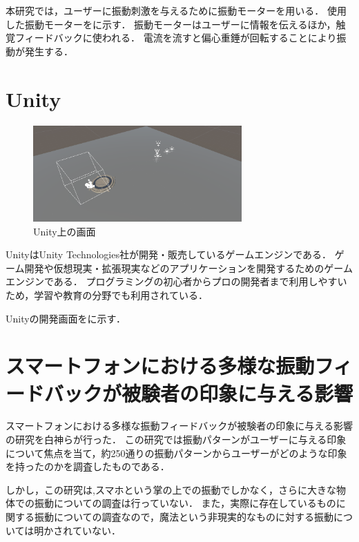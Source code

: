 本研究では，ユーザーに振動刺激を与えるために振動モーターを用いる．
使用した振動モーターをに示す．
振動モーターはユーザーに情報を伝えるほか，触覚フィードバックに使われる．
電流を流すと偏心重錘が回転することにより振動が発生する．

\section{Unity}

\begin{figure}[h]
\centering
\includegraphics[clip,width=8cm]{./fig/unity_first.png}
\caption{Unity上の画面}\label{unity}
\end{figure}

Unity\cite{unity}はUnity Technologies社が開発・販売しているゲームエンジンである．
ゲーム開発や仮想現実・拡張現実などのアプリケーションを開発するためのゲームエンジンである．
プログラミングの初心者からプロの開発者まで利用しやすいため，学習や教育の分野でも利用されている．

Unityの開発画面をに示す．

\newpage
\section{スマートフォンにおける多様な振動フィードバックが被験者の印象に与える影響}
スマートフォンにおける多様な振動フィードバックが被験者の印象に与える影響\cite{smart}の研究を白神らが行った．
この研究では振動パターンがユーザーに与える印象について焦点を当て，約250通りの振動パターンからユーザーがどのような印象を持ったのかを調査したものである．


しかし，この研究は,スマホという掌の上での振動でしかなく，さらに大きな物体での振動についての調査は行っていない．
また，実際に存在しているものに関する振動についての調査なので，魔法という非現実的なものに対する振動については明かされていない．





